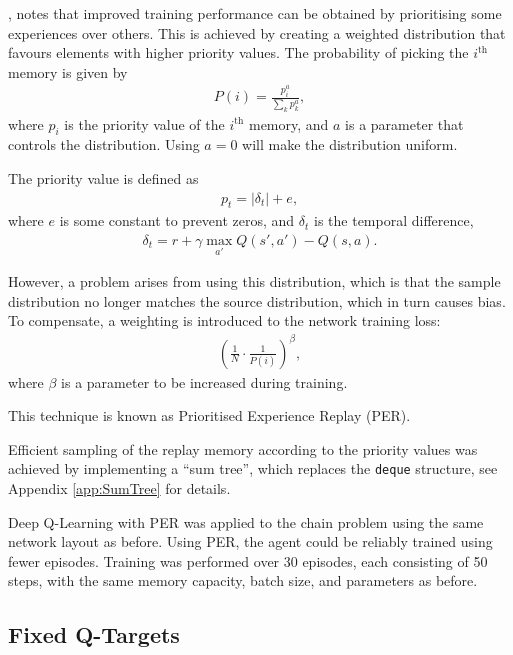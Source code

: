 \cite{Schaul:2015:Prioritized}, notes that improved training performance can be
obtained by prioritising some experiences over others.
This is achieved by creating a weighted distribution that favours elements with
higher priority values.
The probability of picking the $i^\text{th}$ memory is given by
\begin{align*}
    P(i) = \frac{p_i^a}{\sum_{k} p_k^a},
\end{align*}
where $p_i$ is the priority value of the $i^\text{th}$ memory, and $a$ is a
parameter that controls the distribution.
Using $a = 0$ will make the distribution uniform.

The priority value is defined as
\begin{align*}
    p_t = \left|\delta_t\right| + e,
\end{align*}
where $e$ is some constant to prevent zeros, and $\delta_t$ is the temporal
difference,
\begin{align*}
    \delta_t = r + \gamma\max_{a'}Q(s',a') - Q(s,a).
\end{align*}

However, a problem arises from using this distribution, which is that the sample
distribution no longer matches the source distribution, which in turn causes
bias.
To compensate, a weighting is introduced to the network training loss:
\begin{align*}
    \left(\frac{1}{N}\cdot\frac{1}{P(i)}\right)^{\beta},
\end{align*}
where $\beta$ is a parameter to be increased during training.

This technique is known as Prioritised Experience Replay (PER).

Efficient sampling of the replay memory according to the priority values was
achieved by implementing a ``sum tree'', which replaces the \texttt{deque}
structure, see Appendix \ref{app:SumTree} for details.

Deep Q-Learning with PER was applied to the chain problem using the same
network layout as before.
Using PER, the agent could be reliably trained using fewer episodes.
Training was performed over 30 episodes, each consisting of 50 steps, with the
same memory capacity, batch size, and parameters as before.



\subsection{Fixed Q-Targets}

